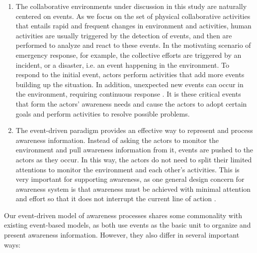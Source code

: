 
\begin{enumerate}
   \item The collaborative environments under discussion in this study are naturally centered on events. As we focus on the set of physical collaborative activities that entails rapid and frequent changes in environment and activities, human activities are usually triggered by the detection of events, and then are performed to analyze and react to these events. In the motivating scenario of emergency response, for example, the collective efforts are triggered by an incident, or a disaster, i.e. an event happening in the environment. To respond to the initial event, actors perform activities that add more events building up the situation. In addition, unexpected new events can occur in the environment, requiring continuous response \cite{Turoff2004}. It is these critical events that form the actors' awareness needs and cause the actors to adopt certain goals and perform activities to resolve possible problems.
   \item The event-driven paradigm provides an effective way to represent and process awareness information. Instead of asking the actors to monitor the environment and pull awareness information from it, events are pushed to the actors as they occur. In this way, the actors do not need to split their limited attentions to monitor the environment and each other's activities. This is very important for supporting awareness, as one general design concern for awareness system is that awareness must be achieved with minimal attention and effort so that it does not interrupt the current line of action \cite{schmidt2002a}. 
\end{enumerate}

Our event-driven model of awareness processes shares some commonality with existing event-based models, as both use events as the basic unit to organize and present awareness information. However, they also differ in several important ways:

